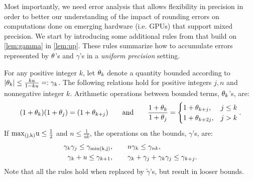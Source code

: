 Most importantly, we need error analysis that allows flexibility in precision in order to better our understanding of the impact of rounding errors on computations done on emerging hardware (i.e. GPUs) that support mixed precision. 
We start by introducing some additional rules from \cite{Higham2002} that build on \cref{lem:gamma} in \cref{lem:up}. 
These rules summarize how to accumulate errors represented by $\theta$'s and $\gamma$'s in a \emph{uniform precision} setting.

\begin{lemma}
\label{lem:up}
For any positive integer $k$, let $\theta_{k}$ denote a quantity bounded according to $|\theta_{k}|\leq \frac{k u }{1-ku} =:\gamma_{k}$. The following relations hold for positive integers $j,n$ and nonnegative integer $k$.
Arithmetic operations between bounded terms, $\theta_{k}$'s, are: 
\begin{equation}
(1+\theta_{k})(1+\theta_{j})=(1+\theta_{k+j})\qquad \mbox{and} \qquad\frac{1+\theta_{k}}{1+\theta_{j}} =
\begin{cases}
	1+\theta_{k+j},& j \leq k\\
	1+\theta_{k+2j},& j > k\\
\end{cases} .
\end{equation}
If $\rm{max}_{(j,k)} u \leq \frac{1}{2}$ and $n \leq \frac{1}{uk}$, the operations on the bounds, $\gamma$'s, are:
	\begin{align*}
	\gamma_{k}\gamma_{j} \leq \gamma_{\rm{min}(k,j)}&,\qquad n\gamma_{k} \leq \gamma_{nk},\\
	\gamma_{k} + u \leq \gamma_{k+1}&,\qquad \gamma_{k}+\gamma_{j}+\gamma_{k}\gamma_{j} \leq \gamma_{k+j}.
	\end{align*}
Note that all the rules hold when replaced by $\tilde{\gamma}$'s, but result in looser bounds.
\end{lemma}

